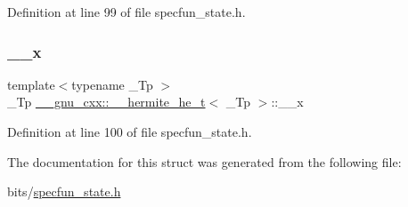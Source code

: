 Definition at line 99 of file specfun\+\_\+state.\+h.

\mbox{\label{struct____gnu__cxx_1_1____hermite__he__t_a24b66f5153ce3e231976e18b4eccb2a0}} 
\subsubsection{\texorpdfstring{\+\_\+\+\_\+x}{\_\_x}}
{\footnotesize\ttfamily template$<$typename \+\_\+\+Tp $>$ \\
\+\_\+\+Tp \hyperlink{struct____gnu__cxx_1_1____hermite__he__t}{\+\_\+\+\_\+gnu\+\_\+cxx\+::\+\_\+\+\_\+hermite\+\_\+he\+\_\+t}$<$ \+\_\+\+Tp $>$\+::\+\_\+\+\_\+x}



Definition at line 100 of file specfun\+\_\+state.\+h.



The documentation for this struct was generated from the following file\+:\begin{DoxyCompactItemize}
\item 
bits/\hyperlink{specfun__state_8h}{specfun\+\_\+state.\+h}\end{DoxyCompactItemize}
